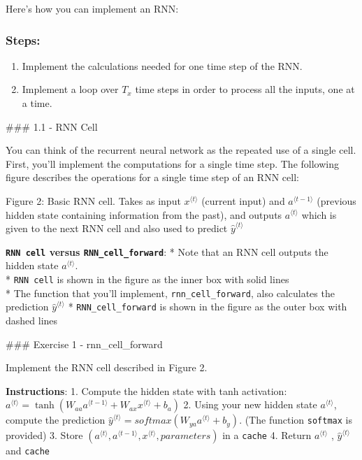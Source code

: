 \documentclass[11pt]{article}
\providecommand{\tightlist}{%
      \setlength{\itemsep}{0pt}\setlength{\parskip}{0pt}}
\begin{document}
    Here's how you can implement an RNN:

\hypertarget{steps}{%
\subsubsection{Steps:}\label{steps}}

\begin{enumerate}
\def\labelenumi{\arabic{enumi}.}
\tightlist
\item
  Implement the calculations needed for one time step of the RNN.
\item
  Implement a loop over \(T_x\) time steps in order to process all the
  inputs, one at a time.
\end{enumerate}

    \#\#\# 1.1 - RNN Cell

You can think of the recurrent neural network as the repeated use of a
single cell. First, you'll implement the computations for a single time
step. The following figure describes the operations for a single time
step of an RNN cell:

Figure 2: Basic RNN cell. Takes as input \(x^{\langle t \rangle}\)
(current input) and \(a^{\langle t - 1\rangle}\) (previous hidden state
containing information from the past), and outputs
\(a^{\langle t \rangle}\) which is given to the next RNN cell and also
used to predict \(\hat{y}^{\langle t \rangle}\)

\textbf{\texttt{RNN\ cell} versus \texttt{RNN\_cell\_forward}}: * Note
that an RNN cell outputs the hidden state \(a^{\langle t \rangle}\).\\
* \texttt{RNN\ cell} is shown in the figure as the inner box with solid
lines\\
* The function that you'll implement, \texttt{rnn\_cell\_forward}, also
calculates the prediction \(\hat{y}^{\langle t \rangle}\) *
\texttt{RNN\_cell\_forward} is shown in the figure as the outer box with
dashed lines

    \#\#\# Exercise 1 - rnn\_cell\_forward

Implement the RNN cell described in Figure 2.

\textbf{Instructions}: 1. Compute the hidden state with tanh activation:
\(a^{\langle t \rangle} = \tanh(W_{aa} a^{\langle t-1 \rangle} + W_{ax} x^{\langle t \rangle} + b_a)\)
2. Using your new hidden state \(a^{\langle t \rangle}\), compute the
prediction
\(\hat{y}^{\langle t \rangle} = softmax(W_{ya} a^{\langle t \rangle} + b_y)\).
(The function \texttt{softmax} is provided) 3. Store
\((a^{\langle t \rangle}, a^{\langle t-1 \rangle}, x^{\langle t \rangle}, parameters)\)
in a \texttt{cache} 4. Return \(a^{\langle t \rangle}\) ,
\(\hat{y}^{\langle t \rangle}\) and \texttt{cache}
\end{document}
